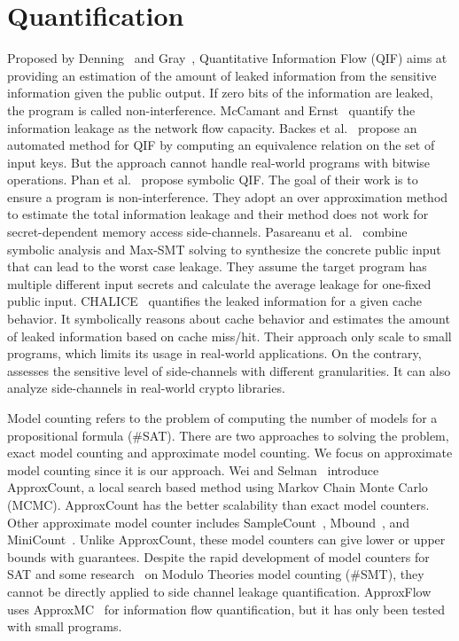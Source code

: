 \section{Quantification}
Proposed by Denning~\cite{robling1982cryptography} and Gray~\cite{gray1992toward}, 
Quantitative Information Flow (QIF) aims at providing an estimation of the amount of leaked information from the sensitive information given the public output. If zero bits
of the information are leaked, the program is called non-interference. McCamant
and Ernst~\cite{McCamantE2008} quantify the information leakage as the network
flow capacity. Backes et al.~\cite{5207642} propose an automated method for QIF
by computing an equivalence relation on the set of input keys. But the approach
cannot handle real-world programs with bitwise operations. 
Phan et al.~\cite{Phan:2012:SQI:2382756.2382791} propose symbolic QIF. The goal of their
work is to ensure a program is non-interference. They adopt an over
approximation method to estimate the total information leakage and their method
does not work for secret-dependent memory access side-channels.
Pasareanu et al.~\cite{pasareanu2016multi} combine symbolic analysis and Max-SMT solving to synthesize the concrete public input that can lead to the worst case leakage. They assume the target program has multiple different input secrets and calculate the average leakage for one-fixed public input.
CHALICE~\cite{Chattopadhyay:2017:QIL:3127041.3127044} quantifies the leaked
information for a given cache behavior. 
It symbolically reasons about cache
behavior and estimates the amount of leaked information based on cache miss/hit.
Their approach only scale to small programs, which limits its usage in
real-world applications. On the contrary, \tool{} assesses the sensitive level
of side-channels with different granularities. It can also analyze side-channels
in real-world crypto libraries.

Model counting refers to the problem of computing the number of 
models for a propositional formula (\#SAT). There are two approaches to
solving the problem, exact model counting and approximate model 
counting. We focus on approximate model counting since it is our approach. Wei and Selman~\cite{wei2005new} introduce
ApproxCount, a local search based method using Markov Chain Monte 
Carlo (MCMC). ApproxCount has the better scalability than 
exact model counters. Other approximate model counter includes 
SampleCount~\cite{gomes2007sampling},
Mbound~\cite{gomes2006model}, and MiniCount~\cite{kroc2008leveraging}. 
Unlike ApproxCount,
these model counters can give lower or upper bounds with guarantees.
Despite the rapid development of model counters for SAT and some 
research~\cite{chistikov2017approximate,phan2015model} on Modulo Theories model counting (\#SMT),
they cannot be directly applied to 
side channel leakage quantification.
ApproxFlow~\cite{biondi2018scalable} uses ApproxMC~\cite{chakraborty2016algorithmic} for information flow quantification,
but it has only been tested with small programs.
